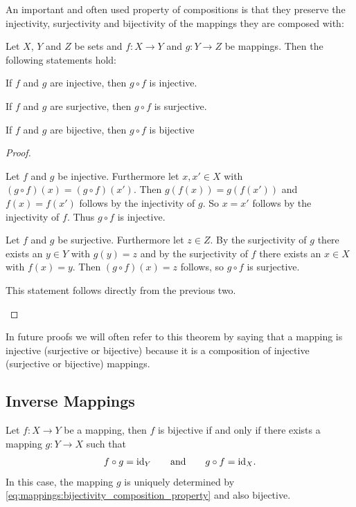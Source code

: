 An important and often used property of compositions is that they preserve the injectivity, surjectivity and bijectivity of the mappings they are composed with:

\begin{theorem}\label{theorem:mappings:composition_preserving} Let $X$, $Y$ and $Z$ be sets and $f\colon X\rightarrow Y$ and $g\colon Y\rightarrow Z$ be mappings. Then the following statements hold:
    \begin{intheoremenumerate}
        \item If $f$ and $g$ are injective, then $g\circ f$ is injective.
        \item If $f$ and $g$ are surjective, then $g\circ f$ is surjective.
        \item If $f$ and $g$ are bijective, then $g\circ f$ is bijective 
    \end{intheoremenumerate}
\end{theorem}

\begin{proof}
    \begin{proofenumerate}
        \item Let $f$ and $g$ be injective. Furthermore let $x,x'\in X$ with $(g\circ f)(x)=(g\circ f)(x')$. Then $g(f(x))=g(f(x'))$ and $f(x)=f(x')$ follows by the injectivity of $g$. So $x=x'$ follows by the injectivity of $f$. Thus $g\circ f$ is injective.
        
        \item Let $f$ and $g$ be surjective. Furthermore let $z\in Z$. By the surjectivity of $g$ there exists an $y\in Y$ with $g(y)=z$ and by the surjectivity of $f$ there exists an $x\in X$ with $f(x)=y$. Then $(g\circ f)(x)=z$ follows, so $g\circ f$ is surjective.
        
        \item This statement follows directly from the previous two.
    \end{proofenumerate}
\end{proof}

In future proofs we will often refer to this theorem by saying that a mapping is injective (surjective or bijective) because it is a composition of injective (surjective or bijective) mappings.

\subsection{Inverse Mappings}

\begin{theorem}\label{theorem:mappings:bijectivity_composition}
    Let $f\colon X\rightarrow Y$ be a mapping, then $f$ is bijective if and only if there exists a mapping $g\colon Y\rightarrow X$ such that \begin{align}f\circ g=\text{id}_Y\qquad\text{and}\qquad g\circ f=\text{id}_X\label{eq:mappings:bijectivity_composition_property}.\end{align}
    In this case, the mapping $g$ is uniquely determined by \eqref{eq:mappings:bijectivity_composition_property} and also bijective.
\end{theorem}

